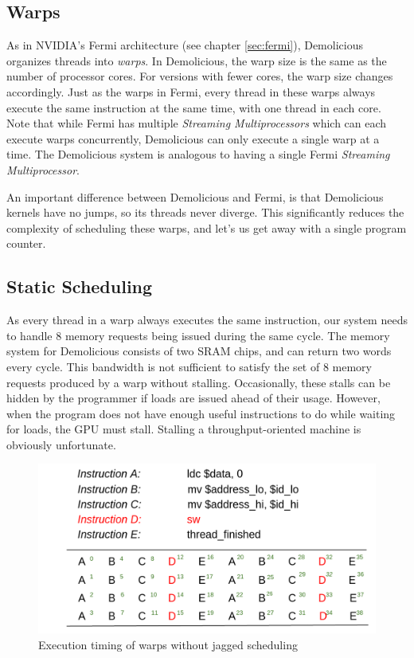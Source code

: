 \documentclass[../main/report.tex]{subfiles}
\begin{document}
\subsection{Warps}

As in NVIDIA's Fermi architecture (see chapter \ref{sec:fermi}), Demolicious organizes threads into \emph{warps}.
In Demolicious, the warp size is the same as the number of processor cores.
For versions with fewer cores, the warp size changes accordingly.
Just as the warps in Fermi, every thread in these warps always execute the same instruction at the same time, with one thread in each core.
Note that while Fermi has multiple \emph{Streaming Multiprocessors} which can each execute warps concurrently, Demolicious can only execute a single warp at a time.
The Demolicious system is analogous to having a single Fermi \emph{Streaming Multiprocessor}.

An important difference between Demolicious and Fermi, is that Demolicious kernels have no jumps, so its threads never diverge.
This significantly reduces the complexity of scheduling these warps, and let's us get away with a single program counter.

\subsection{Static Scheduling}

As every thread in a warp always executes the same instruction, our system needs to handle 8 memory requests being issued during the same cycle.
The memory system for Demolicious consists of two SRAM chips, and can return two words every cycle.
This bandwidth is not sufficient to satisfy the set of 8 memory requests produced by a warp without stalling.
Occasionally, these stalls can be hidden by the programmer if loads are issued ahead of their usage.
However, when the program does not have enough useful instructions to do while waiting for loads, the GPU must stall.
Stalling a throughput-oriented machine is obviously unfortunate.

\begin{figure}[htp]
\centering
\includegraphics[scale=0.25]{../gpu/diagrams/uten_jaktstart_num.png}
\caption{Execution timing of warps without jagged scheduling}
\label{fig:nojagged}
\end{figure}
\end{document}
